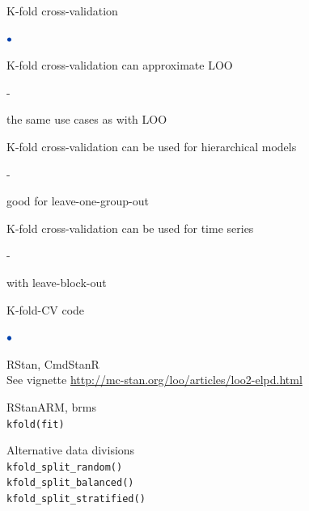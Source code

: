 \documentclass[english,t]{beamer}
\newenvironment{list1}{
   \begin{list}{$\color{list1}\bullet$}{\itemsep=6pt}}{
  \end{list}}
\newenvironment{list2}{
  \begin{list}{-}{\baselineskip=12pt\itemsep=2pt}}{
  \end{list}}
\begin{document}
\begin{frame}{K-fold cross-validation}

\begin{list1}
\item K-fold cross-validation can approximate LOO
  \begin{list2}
    \item the same use cases as with LOO
  \end{list2}
\item K-fold cross-validation can be used for hierarchical models
  \begin{list2}
    \item good for leave-one-group-out
  \end{list2}
\item K-fold cross-validation can be used for time series
  \begin{list2}
    \item with leave-block-out
  \end{list2}
\end{list1}

\end{frame}

\begin{frame}{}

  
\end{frame}

\begin{frame}{K-fold-CV code}

  \begin{list1}
  \item RStan, CmdStanR\\
    See vignette \url{http://mc-stan.org/loo/articles/loo2-elpd.html}
  \item RStanARM, brms\\
    \texttt{kfold(fit)}
  \item Alternative data divisions\\
  \texttt{kfold\_split\_random()}\\ \vspace{0.2\baselineskip}
  \texttt{kfold\_split\_balanced()}\\ \vspace{0.2\baselineskip}
  \texttt{kfold\_split\_stratified()}
  \end{list1}
  
\end{frame}
\end{document}
